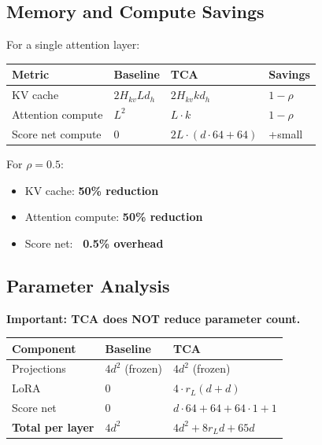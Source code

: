 \subsection{Memory and Compute Savings}

For a single attention layer:

\begin{table}[H]
\centering
\small
\begin{tabular}{llll}
\toprule
\textbf{Metric} & \textbf{Baseline} & \textbf{TCA} & \textbf{Savings} \\
\midrule
KV cache & $2 H_{kv} L d_h$ & $2 H_{kv} k d_h$ & $1 - \rho$ \\
Attention compute & $L^2$ & $L \cdot k$ & $1 - \rho$ \\
Score net compute & 0 & $2 L \cdot (d \cdot 64 + 64)$ & +small \\
\bottomrule
\end{tabular}
\end{table}

For $\rho = 0.5$:

\begin{itemize}
\item KV cache: \textbf{50\% reduction}
\item Attention compute: \textbf{50\% reduction}
\item Score net: \textbf{~0.5\% overhead}

\end{itemize}
\subsection{Parameter Analysis}

\textbf{Important: TCA does NOT reduce parameter count.}

\begin{table}[H]
\centering
\small
\begin{tabular}{lll}
\toprule
\textbf{Component} & \textbf{Baseline} & \textbf{TCA} \\
\midrule
Projections & $4 d^2$ (frozen) & $4 d^2$ (frozen) \\
LoRA & 0 & $4 \cdot r_L (d + d)$ \\
Score net & 0 & $d \cdot 64 + 64 + 64 \cdot 1 + 1$ \\
\textbf{Total per layer} & $4 d^2$ & $4 d^2 + 8 r_L d + 65 d$ \\
\bottomrule
\end{tabular}
\end{table}

